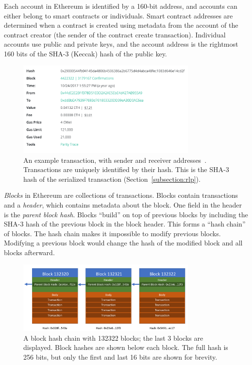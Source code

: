 \documentclass[12pt]{article}
\newcommand{\figurewidth}{0.8\textwidth}
\begin{document}
Each account in Ethereum is identified by a 160-bit address, and accounts can either belong to smart contracts or individuals. Smart contract addresses are determined when a contract is created using metadata from the account of the contract creator (the sender of the contract create transaction). Individual accounts use public and private keys, and the account address is the rightmost 160 bits of the SHA-3 (Keccak) hash of the public key. %

\begin{figure}[H]
  \centering
  \includegraphics[width=\figurewidth]{../figures/background/transactions/example_transaction.png}
  \caption{An example transaction, with sender and receiver addresses~\cite{etherchain-transaction}. Transactions are uniquely identified by their hash. This is the SHA-3 hash of the serialized transaction (Section~\ref{subsection:rlp}).}
\end{figure}

\emph{Blocks} in Ethereum are collections of transactions. Blocks contain transactions and a \emph{header}, which contains metadata about the block. One field in the header is the \emph{parent block hash}. Blocks ``build'' on top of previous blocks by including the SHA-3 hash of the previous block in the block header. This forms a ``hash chain'' of blocks. The hash chain makes it impossible to modify previous blocks. Modifying a previous block would change the hash of the modified block and all blocks afterward.

\begin{figure}[H]
  \centering
  \includegraphics[width=\figurewidth]{../figures/background/blocks/blocks.pdf}
  \caption{A block hash chain with 132322 blocks; the last 3 blocks are displayed. Block hashes are shown below each block. The full hash is 256 bits, but only the first and last 16 bits are shown for brevity.}
\end{figure}
\end{document}
